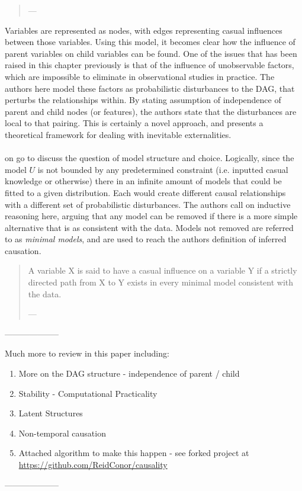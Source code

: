 {\begin{quote}
\hspace{2cm}---  \cite {pearl1995theory}
\end{quote}
Variables are represented as nodes, with edges representing casual influences between those variables. Using this model, it becomes clear how the influence of parent variables on child variables can be found. One of the issues that has been raised in this chapter previously is that of the influence of unobservable factors, which are impossible to eliminate in observational studies in practice. The authors here model these factors as probabilistic disturbances to the DAG, that perturbs the relationships within. By stating assumption of independence of parent and child nodes (or features), the authors state that the disturbances are local to that pairing. This is certainly a novel approach, and presents a theoretical framework for dealing with inevitable externalities.\\\\
\cite {pearl1995theory} on go to discuss the question of model structure and choice. Logically, since the model $U$ is not bounded by any predetermined constraint (i.e. inputted casual knowledge or otherwise) there in an infinite amount of models that could be fitted to a given distribution. Each would create different causal relationships with a different set of probabilistic disturbances. The authors call on inductive reasoning here, arguing that any model can be removed if there is a more simple alternative that is as consistent with the data. Models not removed are referred to as {\it minimal models}, and are used to reach the authors definition of inferred causation. 
\begin{quote}
A variable X is said to have a casual influence on a variable Y if a strictly directed path from X to Y exists in every minimal model consistent with the data. 

\hspace{2cm}---  \cite {pearl1995theory}
\end{quote}

--------------------\\
{\color{red}
Much more to review in this paper including:
\begin{enumerate}
\item{More on the DAG structure - independence of parent / child}
\item{Stability - Computational Practicality}
\item{Latent Structures}
\item{Non-temporal causation}
\item{Attached algorithm to make this happen - see forked project at \url {https://github.com/ReidConor/causality}}
\end{enumerate}}
--------------------
}
